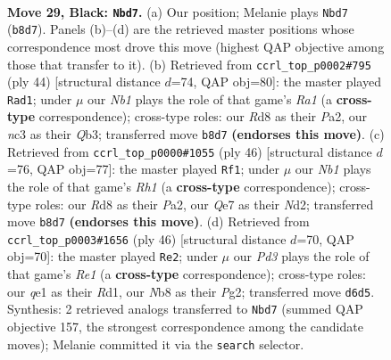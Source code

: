 \documentclass[11pt]{article}
\begin{document}
\clearpage

\begin{figure}[p]\centering
\begin{subfigure}{0.46\textwidth}\centering
\resizebox{\linewidth}{!}{%
\newchessgame
\chessboard[
  setfen={1n1r2k1/4q1p1/rp1ppn2/4p2p/P3P2N/2N3P1/2P2P1P/R1R1Q1K1 b - - 3 29},
  showmover=false,
  pgfstyle=straightmove, color=movearrow, markmove={b8-d7}
]}
\caption{}
\end{subfigure}\hfill
\begin{subfigure}{0.46\textwidth}\centering
\resizebox{\linewidth}{!}{%
\newchessgame
\chessboard[
  setfen={2r2rk1/pp1q2p1/4p2p/4Pn2/2Pp3P/1Q3N2/P2R1PP1/R5K1 w - - 0 23},
  showmover=false,
  pgfstyle=straightmove, color=movearrow, markmove={a1-d1}
]}
\caption{}
\end{subfigure}
\\[4pt]
\begin{subfigure}{0.46\textwidth}\centering
\resizebox{\linewidth}{!}{%
\newchessgame
\chessboard[
  setfen={1k1r3r/1qp1np2/pp1ppn2/7p/3PP3/3QP1PR/PPPNN3/2K4R w - - 3 24},
  showmover=false,
  pgfstyle=straightmove, color=movearrow, markmove={h1-f1}
]}
\caption{}
\end{subfigure}\hfill
\begin{subfigure}{0.46\textwidth}\centering
\resizebox{\linewidth}{!}{%
\newchessgame
\chessboard[
  setfen={2r4r/1p3k2/2qpppp1/p6p/2n1PP2/2PN1Q2/PP4PP/1K1RR3 w - - 2 24},
  showmover=false,
  pgfstyle=straightmove, color=movearrow, markmove={e1-e2}
]}
\caption{}
\end{subfigure}
\caption{\textbf{Move 29, Black: \texttt{Nbd7}.} (a) Our position; Melanie plays \texttt{Nbd7} (\texttt{b8d7}). Panels (b)--(d) are the retrieved master positions whose correspondence most drove this move (highest QAP objective among those that transfer to it). (b) Retrieved from \texttt{ccrl\_top\_p0002\#795} (ply 44) [structural distance $d$=74, QAP obj=80]: the master played \texttt{Rad1}; under $\mu$ our \emph{Nb1} plays the role of that game's \emph{Ra1} (a \textbf{cross-type} correspondence); cross-type roles: our \emph{R}d8 as their \emph{P}a2, our \emph{n}c3 as their \emph{Q}b3; transferred move \texttt{b8d7} \textbf{(endorses this move)}. (c) Retrieved from \texttt{ccrl\_top\_p0000\#1055} (ply 46) [structural distance $d$=76, QAP obj=77]: the master played \texttt{Rf1}; under $\mu$ our \emph{Nb1} plays the role of that game's \emph{Rh1} (a \textbf{cross-type} correspondence); cross-type roles: our \emph{R}d8 as their \emph{P}a2, our \emph{Q}e7 as their \emph{N}d2; transferred move \texttt{b8d7} \textbf{(endorses this move)}. (d) Retrieved from \texttt{ccrl\_top\_p0003\#1656} (ply 46) [structural distance $d$=70, QAP obj=70]: the master played \texttt{Re2}; under $\mu$ our \emph{Pd3} plays the role of that game's \emph{Re1} (a \textbf{cross-type} correspondence); cross-type roles: our \emph{q}e1 as their \emph{R}d1, our \emph{N}b8 as their \emph{P}g2; transferred move \texttt{d6d5}. Synthesis: 2 retrieved analogs transferred to \texttt{Nbd7} (summed QAP objective 157, the strongest correspondence among the candidate moves); Melanie committed it via the \texttt{search} selector.}
\label{fig:thought-m57}
\end{figure}
\end{document}
